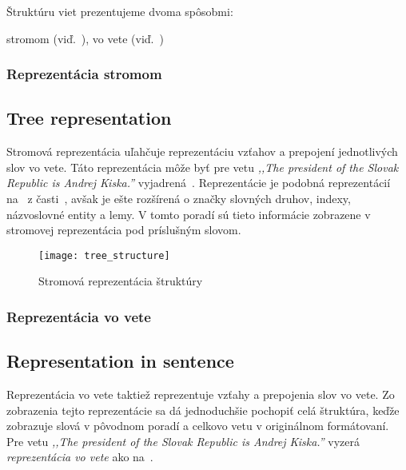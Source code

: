 Štruktúru viet prezentujeme dvoma spôsobmi:
\begin{my_itemize}
	\myitem stromom (viď.~),
	\myitem vo vete (viď.~)
\end{my_itemize}

%
%
{
	\subsubsection{Reprezentácia stromom}
}
{
	\subsection{Tree representation}
}
\label{subsubsection:structure_tree_representation}
Stromová reprezentácia uľahčuje reprezentáciu vzťahov a prepojení jednotlivých slov vo vete. Táto reprezentácia môže byť pre vetu \textit{,,The president of the Slovak Republic is Andrej Kiska.''} vyjadrená~. Reprezentácie je podobná reprezentácií na~ z časti~, avšak je ešte rozšírená o značky slovných druhov, indexy, názvoslovné entity a lemy. V tomto poradí sú tieto informácie zobrazene v stromovej reprezentácia pod príslušným slovom.

\begin{figure}[H]
	\begin{center}\texttt{[image: tree\_structure]}\end{center}
	\caption[Stromová reprezentácia štruktúry]{Stromová reprezentácia štruktúry}\label{fig:tree_structure}
\end{figure}

%
%
{
	\subsubsection{Reprezentácia vo vete}
}
{
	\subsection{Representation in sentence}
}
\label{subsubsection:structure_representation_in_sentence}
Reprezentácia vo vete taktiež reprezentuje vzťahy a prepojenia slov vo vete. Zo zobrazenia tejto reprezentácie sa dá jednoduchšie pochopiť celá štruktúra, keďže zobrazuje slová v pôvodnom poradí a celkovo vetu v originálnom formátovaní. Pre vetu \textit{,,The president of the Slovak Republic is Andrej Kiska.''} vyzerá \textit{reprezentácia vo vete} ako na~.

